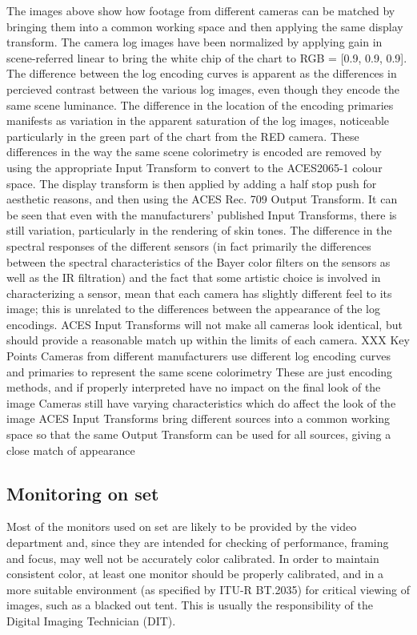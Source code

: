 The images above show how footage from different cameras can be matched by bringing them into a common working space and then applying the same display transform. The camera log images have been normalized by applying gain in scene-referred linear to bring the white chip of the chart to RGB = [0.9, 0.9, 0.9]. The difference between the log encoding curves is apparent as the differences in percieved contrast between the various log images, even though they encode the same scene luminance. The difference in the location of the encoding primaries manifests as variation in the apparent saturation of the log images, noticeable particularly in the green part of the chart from the RED camera. These differences in the way the same scene colorimetry is encoded are removed by using the appropriate Input Transform to convert to the ACES2065-1 colour space. The display transform is then applied by adding a half stop push for aesthetic reasons, and then using the ACES Rec. 709 Output Transform. It can be seen that even with the manufacturers’ published Input Transforms, there is still variation, particularly in the rendering of skin tones. The difference in the spectral responses of the different sensors (in fact primarily the differences between the spectral characteristics of the Bayer color filters on the sensors as well as the IR filtration) and the fact that some artistic choice is involved in characterizing a sensor, mean that each camera has slightly different feel to its image; this is unrelated to the differences between the appearance of the log encodings. ACES Input Transforms will not make all cameras look identical, but should provide a reasonable match up within the limits of each camera.
XXX
Key Points
Cameras from different manufacturers use different log encoding curves and primaries to represent the same scene colorimetry
These are just encoding methods, and if properly interpreted have no impact on the final look of the image
Cameras still have varying characteristics which do affect the look of the image
ACES Input Transforms bring different sources into a common working space so that the same Output Transform can be used for all sources, giving a close match of appearance

\subsection{Monitoring on set}

Most of the monitors used on set are likely to be provided by the video department and, since they are intended for checking of performance, framing and focus, may well not be accurately color calibrated. In order to maintain consistent color, at least one monitor should be properly calibrated, and in a more suitable environment (as specified by ITU-R BT.2035) for critical viewing of images, such as a blacked out tent. This is usually the responsibility of the Digital Imaging Technician (DIT).

